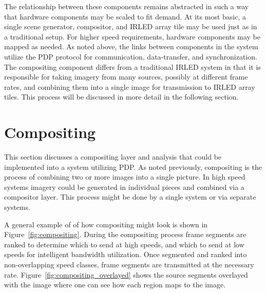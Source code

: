     The relationship between these components remains abstracted in such a way that hardware components may be scaled to fit demand. At its most basic, a single scene generator, compositor, and IRLED array tile may be used just as in a traditional setup. For higher speed requirements, hardware components may be mapped as needed. As noted above, the links between components in the system utilize the PDP protocol for communication, data-transfer, and synchronization. The compositing component differs from a traditional IRLED system in that it is responsible for taking imagery from many sources, possibly at different frame rates, and combining them into a single image for transmission to IRLED array tiles. This process will be discussed in more detail in the following section.

\section{Compositing}
    \label{sec:compositing}
    This section discusses a compositing layer and analysis that could be implemented into a system utilizing PDP. As noted previously, compositing is the process of combining two or more images into a single picture. In high speed systems imagery could be generated in individual pieces and combined via a compositor layer. This process might be done by a single system or via separate systems.

     A general example of of how compositing might look is shown in Figure~\ref{fig:compositing}. During the compositing process frame segments are ranked to determine which to send at high speeds, and which to send at low speeds for intelligent bandwidth utilization. Once segmented and ranked into non-overlapping speed classes, frame segments are transmitted at the necessary rate. Figure~\ref{fig:compositing_overlayed} shows the source segments overlayed with the image where one can see how each region maps to the image.

